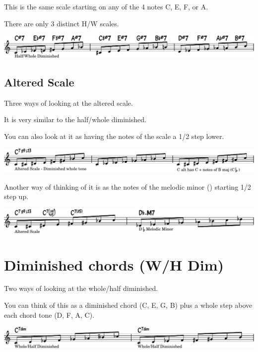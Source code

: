 \documentclass[11pt]{article}
\begin{document}
This is the same scale starting on any of the 4 notes C, E\flat, F\sharp, or A.

There are only 3 distinct H/W scales.

\begin{center}
\includegraphics[width=.98\linewidth]{half-whole-dim-3.pdf}
\end{center}

\subsection{Altered Scale}
\label{sec:orgcd74133}
Three ways of looking at the altered scale.

It is very similar to the half/whole diminished.

You can also look at it as having the notes of the scale a 1/2 step lower.
\begin{center}
\includegraphics[width=.98\linewidth]{altered.pdf}
\end{center}

Another way of thinking of it is as the notes of the melodic minor () starting 1/2 step up.

\begin{center}
\includegraphics[width=.98\linewidth]{altered-as-melodic-minor.pdf}
\end{center}

\section{Diminished chords (W/H Dim)}
\label{sec:org8104e4a}
Two ways of looking at the whole/half diminished.

You can think of this as a diminished chord (C, E\flat, G\flat, B\flat\flat) plus a whole step above each chord tone (D, F, A\flat, C\flat).

\begin{center}
\includegraphics[width=.98\linewidth]{whole-half-dim.pdf}
\end{center}
\end{document}
